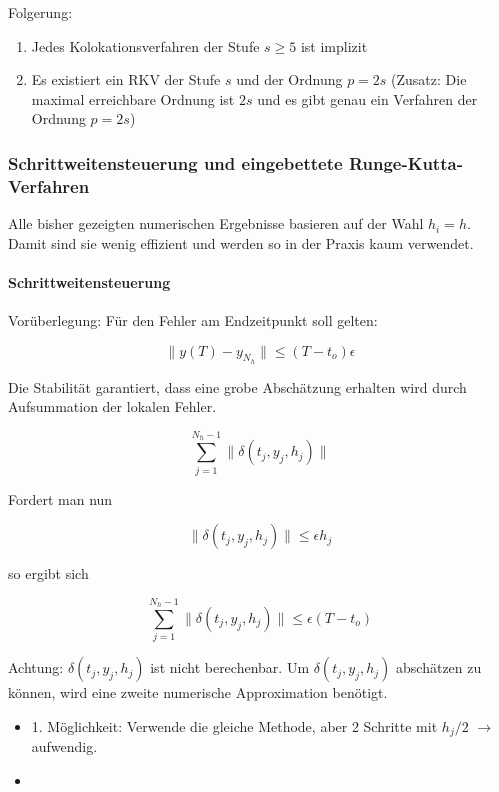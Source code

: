 Folgerung: 
\begin{enumerate}
	\item Jedes Kolokationsverfahren der Stufe $s \ge 5$ ist implizit
	\item Es existiert ein RKV der Stufe $s$ und der Ordnung $p=2s$ (Zusatz: Die maximal erreichbare Ordnung ist $2s$ und es gibt genau ein Verfahren der Ordnung $p=2s$)
\end{enumerate}

\subsubsection{Schrittweitensteuerung und eingebettete Runge-Kutta-Verfahren}

Alle bisher gezeigten numerischen Ergebnisse basieren auf der Wahl $h_i = h$. Damit sind sie wenig effizient und werden so in der Praxis kaum verwendet.

\paragraph{Schrittweitensteuerung}

Vorüberlegung: Für den Fehler am Endzeitpunkt soll gelten:

$$\|y(T) - y_{N_h}\| \le (T-t_o)\epsilon$$

Die Stabilität garantiert, dass eine grobe Abschätzung erhalten wird durch Aufsummation der lokalen Fehler.

$$\sum_{j=1}^{N_h-1} \| \delta(t_j, y_j, h_j) \|$$

Fordert man nun 

$$\|\delta(t_j, y_j, h_j)\| \le \epsilon h_j$$

so ergibt sich

$$\sum_{j=1}^{N_h-1} \|\delta(t_j, y_j, h_j)\| \le \epsilon (T-t_o)$$

Achtung: $\delta(t_j, y_j, h_j)$ ist nicht berechenbar. Um $\delta(t_j, y_j, h_j)$ abschätzen zu können, wird eine zweite numerische Approximation benötigt.

\begin{itemize}
	\item 1. Möglichkeit: Verwende die gleiche Methode, aber 2 Schritte mit $h_j/2$ $\rightarrow$ aufwendig.
	\item
\end{itemize}

